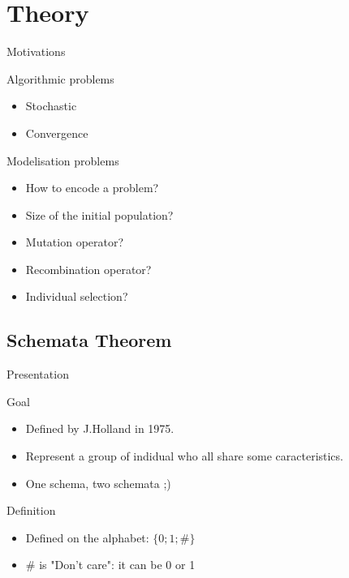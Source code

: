 \section{Theory}

\begin{frame}{Motivations}
  \begin{block}{Algorithmic problems}
    \begin{itemize}
      \item Stochastic
      \item Convergence
    \end{itemize}
  \end{block}

  \begin{block}{Modelisation problems}
    \begin{itemize}
      \item How to encode a problem?
      \item Size of the initial population?
      \item Mutation operator?
      \item Recombination operator?
      \item Individual selection?
    \end{itemize}
  \end{block}
\end{frame}

\subsection{Schemata Theorem}
\begin{frame}{Presentation}
  \begin{block}{Goal}
    \begin{itemize}
    \item Defined by J.Holland in 1975\cite{holland1992}.
    \item Represent a group of indidual who all share some caracteristics.
    \item One schema, two schemata ;)
    \end{itemize}
  \end{block}    

  \begin{block}{Definition}
    \begin{itemize}
    \item Defined on the alphabet: $\{0;1;\#\}$
    \item $\#$ is "Don't care": it can be 0 or 1
    \end{itemize}
  \end{block}
\end{frame}

